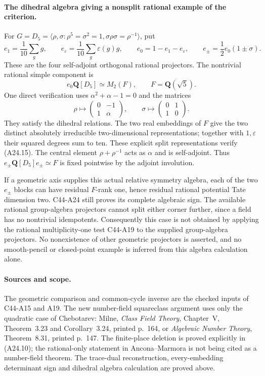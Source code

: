 \documentclass[11pt]{article}
\theoremstyle{remark}\newtheorem{remark}[theorem]{Remark}
\begin{document}
\paragraph{The dihedral algebra giving a nonsplit rational example of the criterion.}
For $G=D_5=\langle\rho,\sigma:\rho^5=\sigma^2=1,
\sigma\rho\sigma=\rho^{-1}\rangle$, put
\[
 e_1=\frac1{10}\sum_g g,\qquad
 e_\varepsilon=\frac1{10}\sum_g\varepsilon(g)g,\qquad
 e_0=1-e_1-e_\varepsilon,\qquad
 e_\pm=\frac12e_0(1\pm\sigma).
 \tag{A24.14}
\]
These are the four self-adjoint orthogonal rational projectors.
The nontrivial rational simple component is
\[
              e_0\mathbf Q[D_5]\simeq M_2(F),
                         \qquad F=\mathbf Q(\sqrt5).
 \tag{A24.15}
\]
One direct verification uses $\alpha^2+\alpha-1=0$ and the matrices
\[
       \rho\longmapsto
          \begin{pmatrix}0&-1\\1&\alpha\end{pmatrix},\qquad
       \sigma\longmapsto
          \begin{pmatrix}0&1\\1&0\end{pmatrix}.
 \tag{A24.16}
\]
They satisfy the dihedral relations.  The two real embeddings of $F$
give the two distinct absolutely irreducible two-dimensional
representations; together with $1,\varepsilon$ their squared degrees
sum to ten.  These explicit split representations verify (A24.15).
The central element $\rho+\rho^{-1}$ acts as $\alpha$ and is
self-adjoint.  Thus
$e_\pm\mathbf Q[D_5]e_\pm\simeq F$ is fixed pointwise by the adjoint
involution.

If a geometric axis supplies this actual relative symmetry algebra,
each of the two $e_\pm$ blocks can have residual $F$-rank one, hence
residual rational potential Tate dimension two.  C44-A24 still proves
its complete algebraic sign.  The available rational group-algebra
projectors cannot split either corner further, since a field has no
nontrivial idempotents.  Consequently this case is not obtained by
applying the rational multiplicity-one test C44-A19 to the supplied
group-algebra projectors.  No nonexistence of other geometric
projectors is asserted, and no smooth-pencil or closed-point example
is inferred from this algebra calculation alone.

\paragraph{Sources and scope.}
The geometric comparison and common-cycle inverse are the checked
inputs of C44-A15 and A19.  The new number-field squareclass argument
uses only the quadratic case of Chebotarev: Milne, \emph{Class Field
Theory}, Chapter~V, Theorem~3.23 and Corollary~3.24, printed p.~164,
or \emph{Algebraic Number Theory}, Theorem~8.31, printed p.~147.
The finite-place deletion is proved explicitly in (A24.10); the
rational-only statement in Ancona--Marmora is not being cited as a
number-field theorem.  The trace-dual reconstruction, every-embedding
determinant sign and dihedral algebra calculation are proved above.
\end{document}
